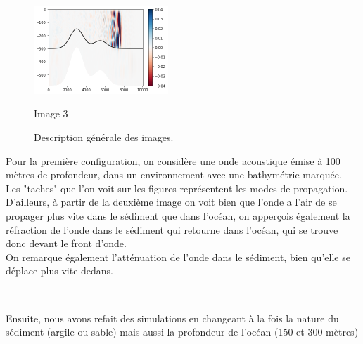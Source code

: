 \documentclass{rapportECC}
\begin{document}
\begin{figure}[H]
    \begin{minipage}{0.9\textwidth}
        \centering
        \includegraphics[width=0.45\textwidth]{images/im6.png}
        \caption{Image 3}
        \label{fig:image3}
    \end{minipage}
    \caption{Description générale des images.}
    \label{fig:three_images}
\end{figure}
Pour la première configuration, on considère une onde acoustique émise à 100 mètres de profondeur, dans un environnement avec une bathymétrie marquée. \\
Les "taches" que l'on voit sur les figures représentent les modes de propagation. \\
D'ailleurs, à  partir de la deuxième image on voit bien que l'onde a l'air de se propager plus vite dans le sédiment que dans l'océan, on apperçois également la réfraction de l'onde dans le sédiment qui retourne dans l'océan, qui se trouve donc devant le front d'onde.\\
On remarque également l'atténuation de l'onde dans le sédiment, bien qu'elle se déplace plus vite dedans.

\\
\vspace{1 cm}

Ensuite, nous avons refait des simulations en changeant à la fois la nature du sédiment (argile ou sable) mais aussi la profondeur de l'océan (150 et 300 mètres)
\end{document}
